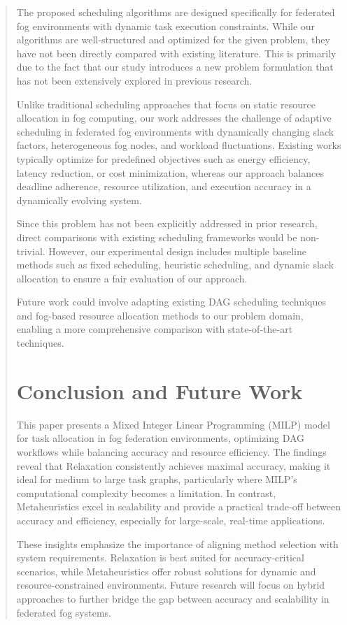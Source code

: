\documentclass[conference]{IEEEtran}
\begin{document}
\begin{abstract}
The proposed scheduling algorithms are designed specifically for federated fog environments with dynamic task execution constraints. While our algorithms are well-structured and optimized for the given problem, they have not been directly compared with existing literature. This is primarily due to the fact that our study introduces a new problem formulation that has not been extensively explored in previous research.

Unlike traditional scheduling approaches that focus on static resource allocation in fog computing, our work addresses the challenge of adaptive scheduling in federated fog environments with dynamically changing slack factors, heterogeneous fog nodes, and workload fluctuations. Existing works typically optimize for predefined objectives such as energy efficiency, latency reduction, or cost minimization, whereas our approach balances deadline adherence, resource utilization, and execution accuracy in a dynamically evolving system.

Since this problem has not been explicitly addressed in prior research, direct comparisons with existing scheduling frameworks would be non-trivial. However, our experimental design includes multiple baseline methods such as fixed scheduling, heuristic scheduling, and dynamic slack allocation to ensure a fair evaluation of our approach.

Future work could involve adapting existing DAG scheduling techniques and fog-based resource allocation methods to our problem domain, enabling a more comprehensive comparison with state-of-the-art techniques.

\section{Conclusion and Future Work}
 
This paper presents a Mixed Integer Linear Programming (MILP) model for task allocation in  fog federation environments, optimizing DAG workflows while balancing accuracy and resource efficiency. The findings reveal that Relaxation consistently achieves maximal accuracy, making it ideal for medium to large task graphs, particularly where MILP's computational complexity becomes a limitation. In contrast, Metaheuristics excel in scalability and provide a practical trade-off between accuracy and efficiency, especially for large-scale, real-time applications.

These insights emphasize the importance of aligning method selection with system requirements. Relaxation is best suited for accuracy-critical scenarios, while Metaheuristics offer robust solutions for dynamic and resource-constrained environments. Future research will focus on hybrid approaches to further bridge the gap between accuracy and scalability in federated fog systems.


\end{abstract}
\end{document}

